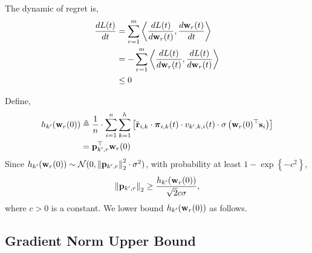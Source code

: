 \documentclass[10pt]{article}
\begin{document}
The dynamic of regret is,
\begin{equation*}
\begin{split}
	\frac{dL(t)}{dt} &= \sum\limits_{r=1}^{m}{ \left\langle \frac{dL(t)}{d {\mathbf{w}}_r(t)}, \frac{d {\mathbf{w}}_r(t)}{dt} \right\rangle} \\
	&= - \sum\limits_{r=1}^{m}{ \left\langle \frac{dL(t)}{d {\mathbf{w}}_r(t)}, \frac{dL(t)}{d {\mathbf{w}}_r(t)} \right\rangle} \\
	&\le 0
\end{split}
\end{equation*}
\fi

Define,
\begin{equation*}
\begin{split}
	h_{k^\prime}({\mathbf{w}}_r(0)) &\triangleq \frac{1}{n} \cdot \sum\limits_{i=1}^{n}{ \sum\limits_{k=1}^{h}{ \left[ {\tilde{\mathbf{r}}}_{i,k} \cdot {\boldsymbol{\pi}}_{i,k}(t) \cdot v_{k^\prime,k,i}(t) \cdot \sigma\left( {\mathbf{w}}_r(0)^\top {\mathbf{s}}_i \right) \right] } } \\
	&= {\mathbf{p}}_{k^\prime, r}^\top {\mathbf{w}}_r(0)
\end{split}
\end{equation*}
Since $h_{k^\prime}({\mathbf{w}}_r(0)) \sim {\mathcal{N}}(0, \left\| {\mathbf{p}}_{k^\prime, r} \right\|_2^2 \cdot \sigma^2 )$, with probability at least $1 - \exp\left\{ - c^2 \right\}$,
\begin{equation*}
	\left\| {\mathbf{p}}_{k^\prime, r} \right\|_2 \ge \frac{ h_{k^\prime}({\mathbf{w}}_r(0)) }{\sqrt{2} c \sigma},
\end{equation*}
where $c > 0$ is a constant. We lower bound $h_{k^\prime}({\mathbf{w}}_r(0))$ as follows. 
\fi

\subsection{Gradient Norm Upper Bound}
\end{document}
